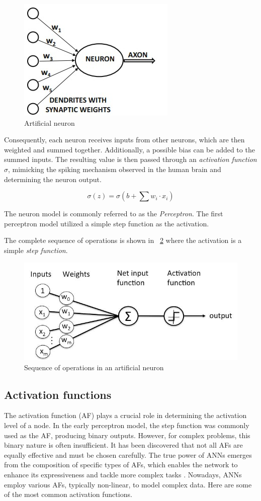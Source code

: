 \begin{figure}[h]
	\centering
	\includegraphics[width=0.4\linewidth]{ImageFiles/NeuralNetworks/art_neuron}
	\caption{Artificial neuron}
	\label{fig:art_neuron}
\end{figure}

Consequently, each neuron receives inputs from other neurons, which are then weighted and summed together. Additionally, a possible bias can be added to the summed inputs. The resulting value is then passed through an \textit{activation function} $\sigma$, mimicking the spiking mechanism observed in the human brain and determining the neuron output.

\[
	\sigma (z) = \sigma (b + \sum w_i \cdot x_i)
\]

The neuron model is commonly referred to as the \textit{Perceptron}. The first perceptron model utilized a simple step function as the activation.

The complete sequence of operations is shown in \Fig~\ref{fig:percep_full} where the activation is a simple \textit{step function}.

\begin{figure}[h]
	\centering
	\includegraphics[width=0.6\linewidth]{ImageFiles/NeuralNetworks/percep_full}
	\caption{Sequence of operations in an artificial neuron \cite{WPBGP}}
	\label{fig:percep_full}
\end{figure}

\subsection{Activation functions}

The activation function (AF) plays a crucial role in determining the activation level of a node. In the early perceptron model, the step function was commonly used as the AF, producing binary outputs. However, for complex problems, this binary nature is often insufficient. It has been discovered that not all AFs are equally effective and must be chosen carefully.
The true power of ANNs emerges from the composition of specific types of AFs, which enables the network to enhance its expressiveness and tackle more complex tasks \cite{aggarwal2018neural}. Nowadays, ANNs employ various AFs, typically non-linear, to model complex data. Here are some of the most common activation functions.


